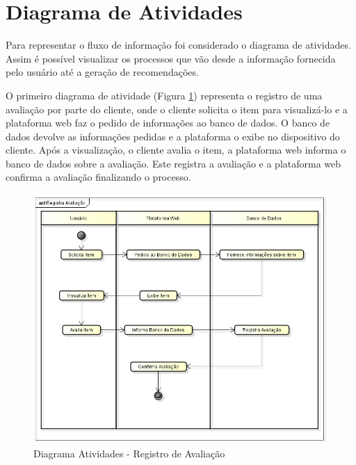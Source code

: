\section{Diagrama de Atividades} %
\label{sec:Diagrama de Atividades}

Para representar o fluxo de informação foi considerado o diagrama de atividades. Assim é possível visualizar os processos que vão desde a informação fornecida pelo usuário até a geração de recomendações.

O primeiro diagrama de atividade (Figura \ref{fig:Diagrama de Atividades - Registro de Avaliacao}) representa o registro de uma avaliação por parte do cliente, onde o cliente solicita o item para visualizá-lo e a plataforma web faz o pedido de informações ao banco de dados. O banco de dados devolve as informações pedidas e a plataforma o exibe no dispositivo do cliente. Após a visualização, o cliente avalia o item, a plataforma web informa o banco de dados sobre a avaliação. Este registra a avaliação e a plataforma web confirma a avaliação finalizando o processo.

 \begin{figure}[htp]
    \begin{center}
    \includegraphics[width=1\textwidth]{img/Atividade_Usuario}
    \end{center}
    \caption{Diagrama Atividades - Registro de Avaliação}
    \label{fig:Diagrama de Atividades - Registro de Avaliacao}
\end{figure}

